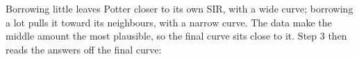 \documentclass[
  letterpaper,
  DIV=11,
  numbers=noendperiod]{scrartcl}
\newenvironment{Shaded}{\begin{snugshade}}{\end{snugshade}}
\newcommand{\AttributeTok}[1]{\textcolor[rgb]{0.40,0.45,0.13}{#1}}
\newcommand{\DecValTok}[1]{\textcolor[rgb]{0.68,0.00,0.00}{#1}}
\newcommand{\FunctionTok}[1]{\textcolor[rgb]{0.28,0.35,0.67}{#1}}
\newcommand{\NormalTok}[1]{\textcolor[rgb]{0.00,0.23,0.31}{#1}}
\newcommand{\OtherTok}[1]{\textcolor[rgb]{0.00,0.23,0.31}{#1}}
\newcommand{\SpecialCharTok}[1]{\textcolor[rgb]{0.37,0.37,0.37}{#1}}
\newcommand{\StringTok}[1]{\textcolor[rgb]{0.13,0.47,0.30}{#1}}
\begin{document}
Borrowing little leaves Potter closer to its own SIR, with a wide curve;
borrowing a lot pulls it toward its neighbours, with a narrow curve. The
data make the middle amount the most plausible, so the final curve sits
close to it. Step 3 then reads the answers off the final curve:

\begin{Shaded}
\end{Shaded}
\end{document}
